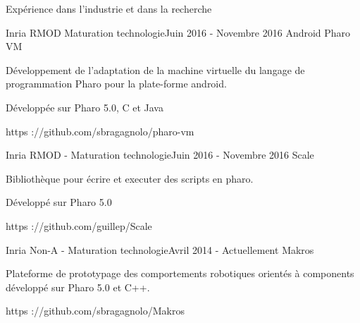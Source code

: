 \documentclass{resume} %
\begin{document}
\begin{rSection}{Exp\'{e}rience dans l'industrie et dans la recherche}
	\begin{rSubsection}{Inria RMOD Maturation technologie}{Juin 2016 - Novembre 2016 }{Android Pharo VM}
		\item		
		\item D\'{e}veloppement de l'adaptation de la  machine virtuelle du langage de programmation Pharo pour la plate-forme android.
		\item D\'{e}velopp\'{e}e sur Pharo 5.0, C et Java
 		\item https ://github.com/sbragagnolo/pharo-vm		
	\end{rSubsection}
	
	\begin{rSubsection}{Inria RMOD - Maturation technologie}{Juin 2016 - Novembre 2016 }{Scale}
		\item 
		\item Biblioth\`eque pour \'ecrire et executer des scripts en pharo. 
		\item D\'{e}velopp\'{e} sur Pharo 5.0 
		\item https ://github.com/guillep/Scale		
	\end{rSubsection}
	
	\begin{rSubsection}{Inria Non-A - Maturation technologie}{Avril 2014 - Actuellement }{Makros}
		\item 
		\item Plateforme de prototypage des comportements robotiques orient\'{e}s \`a components d\'{e}velopp\'{e} sur Pharo 5.0 et C++.
		\item https ://github.com/sbragagnolo/Makros		
	\end{rSubsection}
	

\end{rSection}
\end{document}
